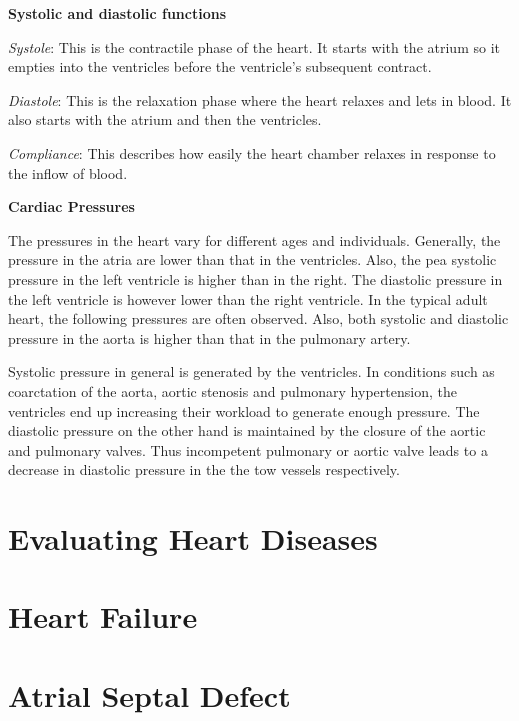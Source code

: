 \documentclass[
  letterpaper,
  DIV=11,
  numbers=noendperiod]{scrreprt}
\begin{document}
\textbf{Systolic and diastolic functions}

\emph{Systole}: This is the contractile phase of the heart. It starts
with the atrium so it empties into the ventricles before the ventricle's
subsequent contract.

\emph{Diastole}: This is the relaxation phase where the heart relaxes
and lets in blood. It also starts with the atrium and then the
ventricles.

\emph{Compliance}: This describes how easily the heart chamber relaxes
in response to the inflow of blood.

\textbf{Cardiac Pressures}

The pressures in the heart vary for different ages and individuals.
Generally, the pressure in the atria are lower than that in the
ventricles. Also, the pea systolic pressure in the left ventricle is
higher than in the right. The diastolic pressure in the left ventricle
is however lower than the right ventricle. In the typical adult heart,
the following pressures are often observed. Also, both systolic and
diastolic pressure in the aorta is higher than that in the pulmonary
artery.

Systolic pressure in general is generated by the ventricles. In
conditions such as coarctation of the aorta, aortic stenosis and
pulmonary hypertension, the ventricles end up increasing their workload
to generate enough pressure. The diastolic pressure on the other hand is
maintained by the closure of the aortic and pulmonary valves. Thus
incompetent pulmonary or aortic valve leads to a decrease in diastolic
pressure in the the tow vessels respectively.

\hypertarget{evaluating-heart-diseases}{%
\chapter{Evaluating Heart Diseases}\label{evaluating-heart-diseases}}

\hypertarget{heart-failure}{%
\chapter{Heart Failure}\label{heart-failure}}

\hypertarget{atrial-septal-defect}{%
\chapter{Atrial Septal Defect}\label{atrial-septal-defect}}
\end{document}

